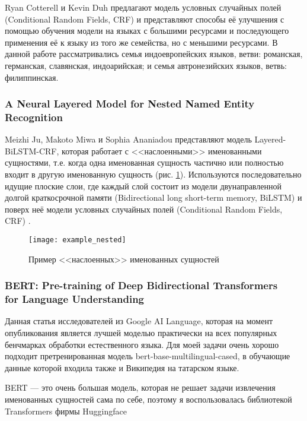 Ryan Cotterell и Kevin Duh  \cite{cotterell-duh-2017-low} предлагают модель условных случайных полей (Conditional Random Fields, CRF) и представляют способы её улучшения с помощью обучения модели на языках с большими ресурсами и последующего применения её к языку из того же семейства, но с меньшими ресурсами. В данной работе рассматривались семья индоевропейских языков, ветви: романская, германская, славянская, индоарийская; и семья автронезийских языков, ветвь: филиппинская.

\subsubsection{A Neural Layered Model for Nested Named Entity Recognition}

Meizhi Ju, Makoto Miwa и Sophia Ananiadou  \cite{ju-etal-2018-neural} представляют модель Layered-BiLSTM-CRF, которая работает с <<наслоенными>> именованными сущностями, т.е. когда одна именованная сущность частично или полностью входит в другую именованную сущность (рис. \ref{fig:example_nested}). Используются последовательно идущие плоские слои, где каждый слой состоит из модели двунаправленной долгой краткосрочной памяти (Bidirectional long short-term memory, BiLSTM) \cite{DBLP:journals/corr/GreffSKSS15} и поверх неё модели условных случайных полей (Conditional Random Fields, CRF) \cite{CRF}. 

\begin{figure}[h]
\caption{Пример <<наслоенных>> именованных сущностей}
\texttt{[image: example\_nested]}
\label{fig:example_nested}
\end{figure}


\subsubsection{BERT: Pre-training of Deep Bidirectional Transformers \\ for Language Understanding} 

Данная статья исследователей из Google AI Language\cite{DBLP:journals/corr/abs-1810-04805}, которая на момент опубликования является лучшей моделью практически на всех популярных бенчмарках обработки естественного языка. Для моей задачи очень хорошо подходит претренированная модель bert-base-multilingual-cased, в обучающие данные которой входила также и Википедия на татарском языке.

BERT --- это очень большая модель, которая не решает задачи извлечения именованных сущностей сама по себе, поэтому я воспользовалась библиотекой Transformers фирмы Huggingface \cite{Wolf2019HuggingFacesTS}

